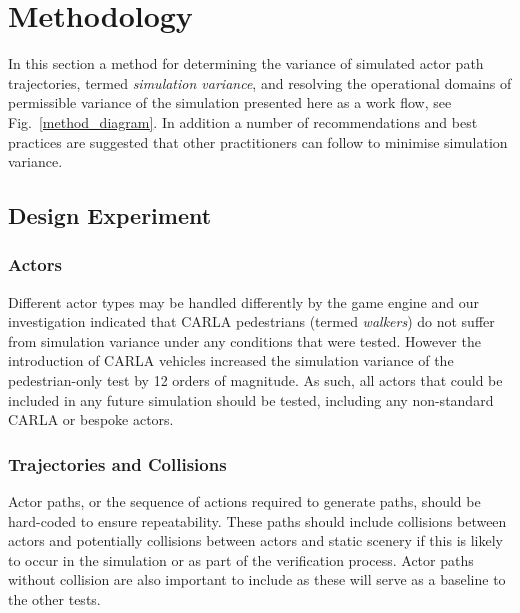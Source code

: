 \documentclass[letterpaper, 10 pt, journal, twoside]{IEEEtran}
\begin{document}
\section{Methodology} \label{s:methodology}
In this section a method for determining the variance of simulated actor path trajectories, termed \textit{simulation variance}, and resolving the operational domains of permissible variance of the simulation presented here as a work flow, see Fig.~\ref{method_diagram}.
%
In addition a number of recommendations and best practices are suggested that other practitioners can follow to minimise simulation variance. 
%
\subsection{Design Experiment}\label{s:design_experiment}

\subsubsection{Actors} \label{s:actors}

Different actor types may be handled differently by the game engine and our investigation indicated that CARLA pedestrians (termed \textit{walkers}) do not suffer from simulation variance under any conditions that were tested. However the introduction of CARLA vehicles increased the simulation variance of the pedestrian-only test by 12 orders of magnitude. As such, all actors that could be included in any future simulation should be tested, including any non-standard CARLA or bespoke actors.
%
\subsubsection{Trajectories and Collisions} 
Actor paths, or the sequence of actions required to generate paths, should be hard-coded to ensure repeatability. These paths should include collisions between actors and potentially collisions between actors and static scenery if this is likely to occur in the simulation or as part of the verification process. Actor paths without collision are also important to include as these will serve as a baseline to the other tests.
\end{document}
